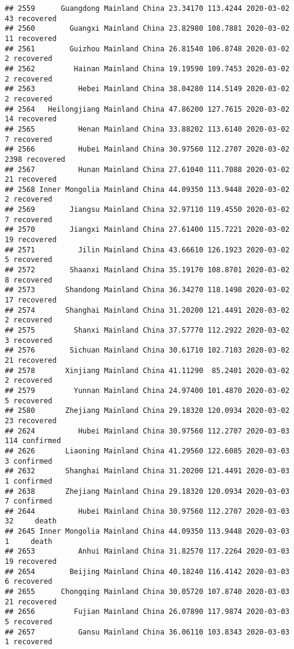 \documentclass[
]{article}
\begin{document}
\begin{verbatim}
## 2559      Guangdong Mainland China 23.34170 113.4244 2020-03-02    43 recovered
## 2560        Guangxi Mainland China 23.82980 108.7881 2020-03-02    11 recovered
## 2561        Guizhou Mainland China 26.81540 106.8748 2020-03-02     2 recovered
## 2562         Hainan Mainland China 19.19590 109.7453 2020-03-02     2 recovered
## 2563          Hebei Mainland China 38.04280 114.5149 2020-03-02     2 recovered
## 2564   Heilongjiang Mainland China 47.86200 127.7615 2020-03-02    14 recovered
## 2565          Henan Mainland China 33.88202 113.6140 2020-03-02     7 recovered
## 2566          Hubei Mainland China 30.97560 112.2707 2020-03-02  2398 recovered
## 2567          Hunan Mainland China 27.61040 111.7088 2020-03-02    21 recovered
## 2568 Inner Mongolia Mainland China 44.09350 113.9448 2020-03-02     2 recovered
## 2569        Jiangsu Mainland China 32.97110 119.4550 2020-03-02     7 recovered
## 2570        Jiangxi Mainland China 27.61400 115.7221 2020-03-02    19 recovered
## 2571          Jilin Mainland China 43.66610 126.1923 2020-03-02     5 recovered
## 2572        Shaanxi Mainland China 35.19170 108.8701 2020-03-02     8 recovered
## 2573       Shandong Mainland China 36.34270 118.1498 2020-03-02    17 recovered
## 2574       Shanghai Mainland China 31.20200 121.4491 2020-03-02     2 recovered
## 2575         Shanxi Mainland China 37.57770 112.2922 2020-03-02     3 recovered
## 2576        Sichuan Mainland China 30.61710 102.7103 2020-03-02    21 recovered
## 2578       Xinjiang Mainland China 41.11290  85.2401 2020-03-02     2 recovered
## 2579         Yunnan Mainland China 24.97400 101.4870 2020-03-02     5 recovered
## 2580       Zhejiang Mainland China 29.18320 120.0934 2020-03-02    23 recovered
## 2624          Hubei Mainland China 30.97560 112.2707 2020-03-03   114 confirmed
## 2626       Liaoning Mainland China 41.29560 122.6085 2020-03-03     3 confirmed
## 2632       Shanghai Mainland China 31.20200 121.4491 2020-03-03     1 confirmed
## 2638       Zhejiang Mainland China 29.18320 120.0934 2020-03-03     7 confirmed
## 2644          Hubei Mainland China 30.97560 112.2707 2020-03-03    32     death
## 2645 Inner Mongolia Mainland China 44.09350 113.9448 2020-03-03     1     death
## 2653          Anhui Mainland China 31.82570 117.2264 2020-03-03    19 recovered
## 2654        Beijing Mainland China 40.18240 116.4142 2020-03-03     6 recovered
## 2655      Chongqing Mainland China 30.05720 107.8740 2020-03-03    21 recovered
## 2656         Fujian Mainland China 26.07890 117.9874 2020-03-03     5 recovered
## 2657          Gansu Mainland China 36.06110 103.8343 2020-03-03     1 recovered

\end{verbatim}
\end{document}
